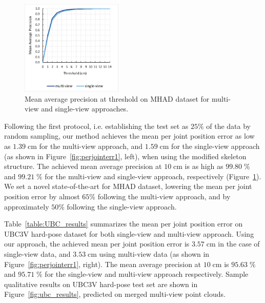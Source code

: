 \begin{figure}[H]
\begin{center}
\centering
\includegraphics[height=170px]{images/results/MHAD_map.png}
\caption[Mean average precision at threshold on MHAD dataset.]{Mean average precision at threshold on MHAD dataset for multi-view and single-view approaches.}
\label{fig:MHAD_mAP}
\end{center}
\end{figure}


\noindent
Following the first protocol, i.e. establishing the test set as $25\%$ of the data by random sampling, our method achieves the mean per joint position error as low as $1.39\;\mbox{cm}$ for the multi-view approach, and $1.59\;\mbox{cm}$ for the single-view approach (as shown in Figure~\ref{fig:perjointerr1}, left), when using the modified skeleton structure. The achieved mean average precision at $10 \; \mbox{cm}$ is as high as $99.80 \; \%$ and $99.21 \; \%$ for the multi-view and single-view approach, respectively (Figure~\ref{fig:MHAD_mAP}). We set a novel state-of-the-art for MHAD dataset, lowering the mean per joint position error by  almost $65\%$ following the multi-view approach, and by approximately $50\%$ following the single-view approach.\par
\vspace{5mm}
\noindent
Table~\ref{table:UBC_results} summarizes the mean per joint position error on UBC3V hard-pose dataset for both single-view and multi-view approach. Using our approach, the achieved mean per joint position error is $3.57 \; \mbox{cm}$ in the case of single-view data, and $3.53 \; \mbox{cm}$ using multi-view data (as shown in Figure~\ref{fig:perjointerr1}, right). The mean average precision at $10 \; \mbox{cm}$ is $95.63 \; \%$ and $95.71 \; \%$ for the single-view and multi-view approach respectively. Sample qualitative results on UBC3V hard-pose test set are shown in Figure~\ref{fig:ubc_results}, predicted on merged multi-view point clouds.\par
\vspace{5mm}

